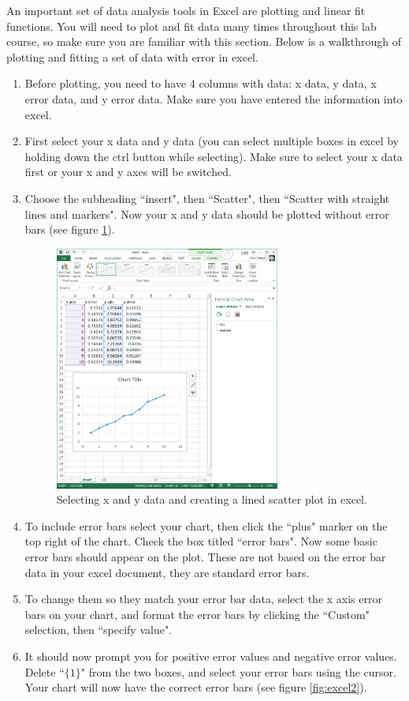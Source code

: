 An important set of data analysis tools in Excel are plotting and linear fit functions. You will need to plot and fit data many times throughout this lab course, so make sure you are familiar with this section. Below is a walkthrough of plotting and fitting a set of data with error in excel.
\begin{enumerate}
\item Before plotting, you need to have 4 columns with data: x data, y data, x error data, and y error data. Make sure you have entered the information into excel.
\item First select your x data and y data (you can select multiple boxes in excel by holding down the ctrl button while selecting). Make sure to select your x data first or your x and y axes will be switched.
\item Choose the subheading ``insert", then ``Scatter", then ``Scatter with straight lines and markers". Now your x and y data should be plotted without error bars (see figure \ref{fig:excel1}).

\begin{figure}[h!]
\centering
\includegraphics[height=0.4\textheight, width=0.7\textwidth]{./Exp1-2/pic/image4.png}
\caption{Selecting x and y data and creating a lined scatter plot in excel.}
\label{fig:excel1}
\end{figure}

\item To include error bars select your chart, then click the ``plus" marker on the top right of the chart. Check the box titled ``error bars". Now some basic error bars should appear on the plot. These are not based on the error bar data in your excel document, they are standard error bars.
\item To change them so they match your error bar data, select the x axis error bars on your chart, and format the error bars by clicking the ``Custom" selection, then ``specify value".
\item It should now prompt you for positive error values and negative error values. Delete ``$\{1\}$" from the two boxes, and select your error bars using the cursor. Your chart will now have the correct error bars (see figure \ref{fig:excel2}).


\end{enumerate}
